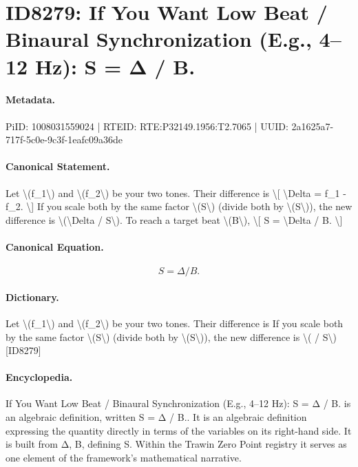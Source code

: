 \section*{ID8279: If You Want Low Beat / Binaural Synchronization (E.g., 4–12 Hz): S = Δ / B.}
\paragraph{Metadata.}
PiID: 1008031559024 | RTEID: RTE:P32149.1956:T2.7065 | UUID: 2a1625a7-717f-5c0e-9c3f-1eafc09a36de

\paragraph{Canonical Statement.}
Let \textbackslash{}(f\_1\textbackslash{}) and \textbackslash{}(f\_2\textbackslash{}) be your two tones. Their difference is \textbackslash{}[ \textbackslash{}Delta = f\_1 - f\_2. \textbackslash{}] If you scale both by the same factor \textbackslash{}(S\textbackslash{}) (divide both by \textbackslash{}(S\textbackslash{})), the new difference is \textbackslash{}(\textbackslash{}Delta / S\textbackslash{}). To reach a target beat \textbackslash{}(B\textbackslash{}), \textbackslash{}[ S = \textbackslash{}Delta / B. \textbackslash{}]

\paragraph{Canonical Equation.}
\[
S = \Delta / B.
\]

\paragraph{Dictionary.}
Let \textbackslash{}(f\_1\textbackslash{}) and \textbackslash{}(f\_2\textbackslash{}) be your two tones. Their difference is If you scale both by the same factor \textbackslash{}(S\textbackslash{}) (divide both by \textbackslash{}(S\textbackslash{})), the new difference is \textbackslash{}( / S\textbackslash{}) [ID8279]

\paragraph{Encyclopedia.}
If You Want Low Beat / Binaural Synchronization (E.g., 4–12 Hz): S = Δ / B. is an algebraic definition, written S = Δ / B.. It is an algebraic definition expressing the quantity directly in terms of the variables on its right-hand side. It is built from Δ, B, defining S. Within the Trawin Zero Point registry it serves as one element of the framework's mathematical narrative.
